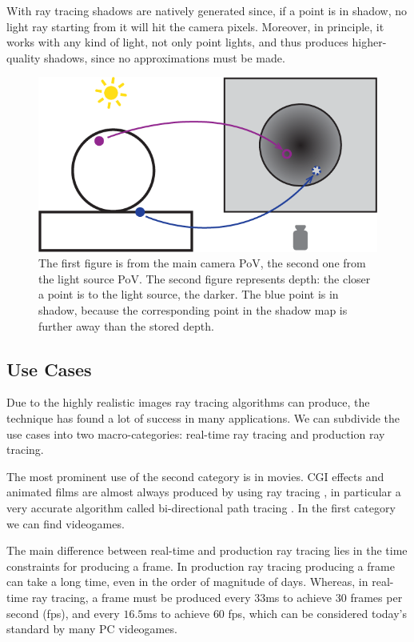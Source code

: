 \documentclass{PoliMi_MasterThesis}
\begin{document}
With ray tracing shadows are natively generated since, if a point is in shadow, no light ray starting from it will hit the camera pixels. Moreover, in principle, it works with any kind of light, not only point lights, and thus produces higher-quality shadows, since no approximations must be made.

\begin{figure}[]
    \centering
    \includegraphics[width=\textwidth*\real{0.65}]{Images/shadow_map.png}
    \caption{The first figure is from the main camera PoV, the second one from the light source PoV. The second figure represents depth: the closer a point is to the light source, the darker. The blue point is in shadow, because the corresponding point in the shadow map is further away than the stored depth.}
    \label{fig:shadow_map}
\end{figure}

\subsection{Use Cases}
Due to the highly realistic images ray tracing algorithms can produce, the technique has found a lot of success in many applications. We can subdivide the use cases into two macro-categories: real-time ray tracing and production ray tracing.

The most prominent use of the second category is in movies. CGI effects and animated films are almost always produced by using ray tracing \cite{path_tracing_movies}, in particular a very accurate algorithm called bi-directional path tracing \cite{bidirectional_path_tracing}. In the first category we can find videogames.

The main difference between real-time and production ray tracing lies in the time constraints for producing a frame. In production ray tracing producing a frame can take a long time, even in the order of magnitude of days. Whereas, in real-time ray tracing, a frame must be produced every $33$ms to achieve $30$ frames per second (fps), and every $16.5$ms to achieve $60$ fps, which can be considered today's standard by many PC videogames.
\end{document}
